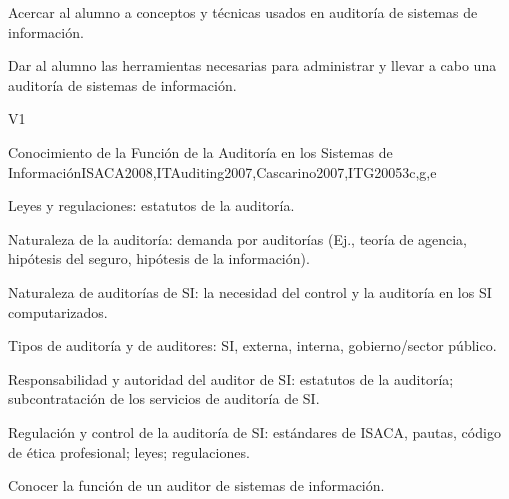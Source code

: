 \begin{syllabus}
	\begin{goals}
	\item Acercar al alumno a conceptos y técnicas usados en auditoría de sistemas de información.
	\item Dar al alumno las herramientas necesarias para administrar y llevar a cabo una auditoría de sistemas de información.
	\end{goals}
	  
	\begin{outcomes}{V1}
		\item {}
		\item {}
		\item {}
		\item {}
		\item {}
		\item {}
		\item {}
		\item {}
	\end{outcomes}
	
	
	
	\begin{unit}{Conocimiento de la Función de la Auditoría en los Sistemas de Información}{}{ISACA2008,ITAuditing2007,Cascarino2007,ITG2005}{3}{c,g,e}
		\begin{topics}
			\item Leyes y regulaciones: estatutos de la auditoría.
			\item Naturaleza de la auditoría: demanda por auditorías (Ej., teoría de agencia, hipótesis del seguro, hipótesis de la información).
			\item Naturaleza de auditorías de SI: la necesidad del control y la auditoría en los SI computarizados.
			\item Tipos de auditoría y de auditores: SI, externa, interna, gobierno/sector público.
			\item Responsabilidad y autoridad del auditor de SI: estatutos de la auditoría; subcontratación de los servicios de auditoría de SI.
			\item Regulación y control de la auditoría de SI: estándares de ISACA, pautas, código de ética profesional; leyes; regulaciones.
		\end{topics}
		\begin{learningoutcomes}
		\item Conocer la función de un auditor de sistemas de información.
		\end{learningoutcomes}
	\end{unit}
	

\end{syllabus}
